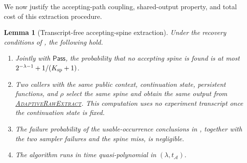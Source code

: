 \documentclass[11pt]{article}
\newtheorem{lemma}{Lemma}[section]
\begin{document}
We now justify the accepting-path coupling, shared-output property, and total
cost of this extraction procedure.

\begin{lemma}[Transcript-free accepting-spine extraction]
\label{lem:spine}
Under the recovery conditions of , the following hold.
\begin{enumerate}[label=(\roman*),leftmargin=*]
 \item Jointly with $\mathsf{Pass}$, the probability that no accepting spine
 is found is at most
 $2^{-\lambda-1}+1/(K_{\rm sp}+1)$.
 \item Two callers with the same public context, continuation state,
 persistent functions, and $\rho$ select the same spine and obtain the same
 output from \hyperref[alg:adaptive-raw]{\textsc{AdaptiveRawExtract}}.  This
 computation uses no experiment transcript once the continuation state is
 fixed.
 \item The failure probability of the usable-occurrence conclusions in
 , together with the two sampler failures and the
 spine miss, is negligible.
 \item The algorithm runs in time quasi-polynomial in
 $(\lambda,t_{\mathcal A})$.
\end{enumerate}
\end{lemma}
\end{document}
